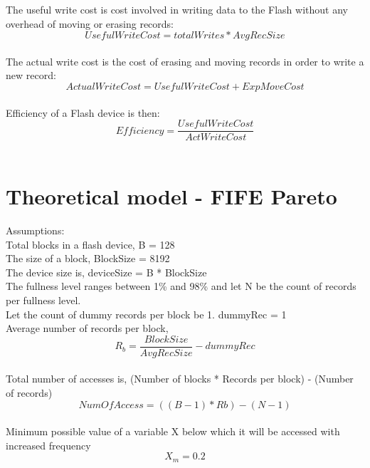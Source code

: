 The useful write cost is cost involved in writing data to the Flash without any overhead of moving or erasing records: \begin{equation}UsefulWriteCost = totalWrites * AvgRecSize\end{equation}\\

The actual write cost is the cost of erasing and moving records in order to write a new record:
\begin{equation}ActualWriteCost = UsefulWriteCost + ExpMoveCost\end{equation}\\

Efficiency of a Flash device is then:
\begin{equation}Efficiency = \frac{UsefulWriteCost}{ActWriteCost}\end{equation}\\


\section{Theoretical model - FIFE Pareto}
Assumptions:\\
Total blocks in a flash device, B = 128\\
The size of a block, BlockSize = 8192\\
The device size is, deviceSize = B * BlockSize\\
The fullness level ranges between 1\% and 98\% and let N be the count of records per fullness level.\\
Let the count of dummy records per block be 1. dummyRec = 1\\
Average number of records per block, 
\begin{equation}R_b = \frac{BlockSize}{AvgRecSize} - dummyRec\end{equation}\\


Total number of accesses is, (Number of blocks * Records per block) - (Number of records)\\
\begin{equation}NumOfAccess = ((B-1) * Rb) -  (N-1)\end{equation}\\

Minimum possible value of a variable X below which it will be accessed with increased frequency
$$X_m = 0.2$$

